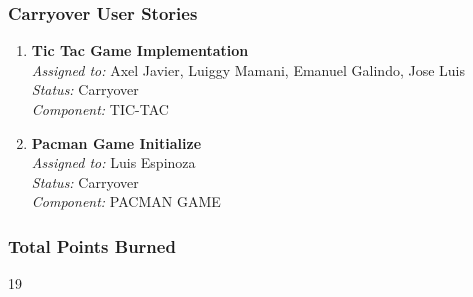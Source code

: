 \subsubsection*{Carryover User Stories}

\begin{enumerate}
    \item \textbf{Tic Tac Game Implementation} \\
    \textit{Assigned to:} Axel Javier, Luiggy Mamani, Emanuel Galindo, Jose Luis \\
    \textit{Status:} Carryover \\
    \textit{Component:} TIC-TAC
    \item \textbf{Pacman Game Initialize } \\
    \textit{Assigned to:} Luis Espinoza \\
    \textit{Status:} Carryover \\
    \textit{Component:} PACMAN GAME

\end{enumerate}

\subsubsection*{Total Points Burned}
19
